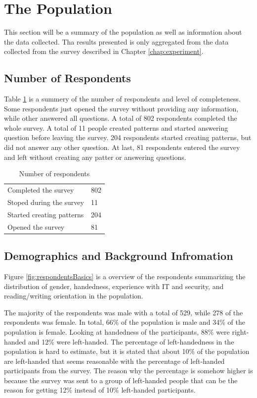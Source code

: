 \section{The Population} \label{sec:basicstatistics}
  
  This section will be a summary of the population as well as information about the data collected. Tha results presented is only aggregated from the data collected from the survey described in Chapter \ref{chap:experiment}. 

  \subsection{Number of Respondents}

    Table \ref{fig:responsespopulation} is a summery of the number of respondents and level of completeness. Some respondents just opened the survey without providing any information, while other answered all questions. A total of 802 respondents completed the whole survey. A total of 11 people created patterns and started answering question before leaving the survey. 204 respondents started creating patterns, but did not answer any other question. At last, 81 respondents entered the survey and left without creating any patter or answering questions. 

    \begin{table}[H]
      \centering
      \begin{tabular}{l | l }
        \hline
        Completed the survey & 802 \\
        Stoped during the survey & 11 \\
        Started creating patterns & 204 \\
        Opened the survey & 81 \\ \hline
      \end{tabular}
      \caption{Number of respondents}
      \label{fig:responsespopulation}
    \end{table}

  \subsection{Demographics and Background Infromation}
  Figure \ref{fig:respondentsBasics} is a overview of the respondents summarizing the distribution of gender, handedness, experience with IT and security, and reading/writing orientation in the population.

  The majority of the respondents was male with a total of 529, while 278 of the respondents was female. In total, 66\% of the population is male and 34\% of the population is female. Looking at handedness of the participants, 88\% were right-handed and 12\% were left-handed. The percentage of left-handedness in the population is hard to estimate, but it is stated that about 10\% of the population are left-handed \cite{lefthandedness} that seems reasonable with the percentage of left-handed participants from the survey. The reason why the percentage is somehow higher is because the survey was sent to a group of left-handed people that can be the reason for getting 12\% instead of 10\% left-handed participants.


